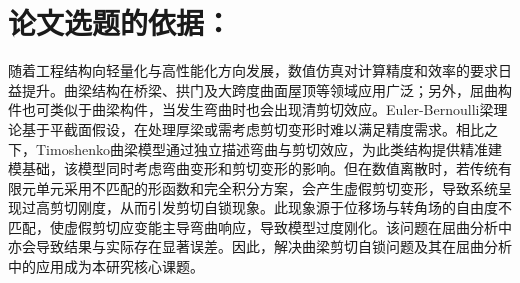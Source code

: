% 
%
%
%
%    

\section{论文选题的依据：}

随着工程结构向轻量化与高性能化方向发展，数值仿真对计算精度和效率的要求日益提升。曲梁结构在桥梁、拱门及大跨度曲面屋顶等领域应用广泛；另外，屈曲构件也可类似于曲梁构件，当发生弯曲时也会出现清剪切效应。Euler-Bernoulli梁理论基于平截面假设，在处理厚梁或需考虑剪切变形时难以满足精度需求。相比之下，Timoshenko曲梁模型通过独立描述弯曲与剪切效应，为此类结构提供精准建模基础，该模型同时考虑弯曲变形和剪切变形的影响\cite{li1990}。但在数值离散时，若传统有限元单元采用不匹配的形函数和完全积分方案，会产生虚假剪切变形，导致系统呈现过高剪切刚度，从而引发剪切自锁现象\cite{hughes1977, belytschko1985, kreja1988, bouclier2012, zhang2018, baier-saip2020}。此现象源于位移场与转角场的自由度不匹配，使虚假剪切应变能主导弯曲响应，导致模型过度刚化。该问题在屈曲分析中亦会导致结果与实际存在显著误差。因此，解决曲梁剪切自锁问题及其在屈曲分析中的应用成为本研究核心课题。


